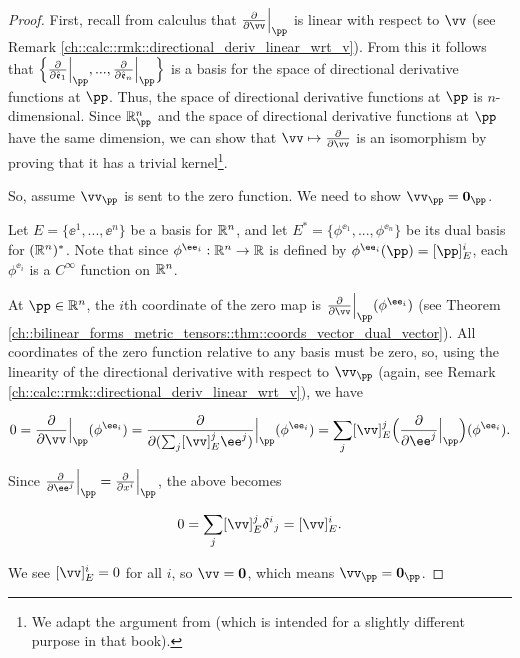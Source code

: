 \begin{proof}
    First, recall from calculus that $\frac{\pd}{\pd \vv}\Big|_\pp$ is linear with respect to $\vv$ (see Remark \ref{ch::calc::rmk::directional_deriv_linear_wrt_v}). From this it follows that $\Big\{ \frac{\pd}{\pd \see_1}\Big|_\pp, ..., \frac{\pd}{\pd \see_n}\Big|_\pp \Big\}$ is a basis for the space of directional derivative functions at $\pp$. Thus, the space of directional derivative functions at $\pp$ is $n$-dimensional. Since $\R^n_\pp$ and the space of directional derivative functions at $\pp$ have the same dimension, we can show that $\vv \mapsto \frac{\pd}{\pd \vv}$ is an isomorphism by proving that it has a trivial kernel\footnote{We adapt the argument from \cite[p. 53]{book::SM} (which is intended for a slightly different purpose in that book).}.
    
    So, assume $\vv_\pp$ is sent to the zero function. We need to show $\vv_\pp = \mathbf{0}_\pp$. 
    
    Let $E = \{\ee^1, ..., \ee^n\}$ be a basis for $\mathbb{R}^n$, and let $E^* = \{\phi^{\ee_1}, ..., \phi^{\ee_n}\}$ be its dual basis for $(\mathbb{R}^n)^*$. Note that since $\phi^{\ee_i}:\R^n \rightarrow \R$ is defined by $\phi^{\ee_i}(\pp) = [\pp]_E^i$, each $\phi^{\ee_i}$ is a $C^\infty$ function on $\mathbb{R}^n$.
    
    At $\pp \in \R^n$, the $i$th coordinate of the zero map is $\frac{\pd}{\pd \vv}\Big|_\pp (\phi^{\ee_i})$ (see Theorem \ref{ch::bilinear_forms_metric_tensors::thm::coords_vector_dual_vector}). All coordinates of the zero function relative to any basis must be zero, so, using the linearity of the directional derivative with respect to $\vv_\pp$ (again, see Remark \ref{ch::calc::rmk::directional_deriv_linear_wrt_v}), we have
    
    \begin{align*}
        0 
        = \frac{\pd}{\pd \vv}\Big|_\pp (\phi^{\ee_i}) 
        = \frac{\pd}{\pd (\sum_j [\vv]_E^j \ee^j)}\Big|_\pp (\phi^{\ee_i}) 
        = \sum_j [\vv]_E^j \Big( \frac{\pd}{\pd \ee^j}\Big|_\pp \Big) (\phi^{\ee_i}).
    \end{align*}
    
    Since $\frac{\pd}{\pd \ee^j}\Big|_\pp = \frac{\pd}{\pd x^i}\Big|_\pp$, the above becomes
    
    \begin{align*}
        0 = \sum_j [\vv]_E^j \delta^i{}_j = [\vv]_E^i.
    \end{align*}
    
    We see $[\vv]_E^i = 0$ for all $i$, so $\vv = \mathbf{0}$, which means $\vv_\pp = \mathbf{0}_\pp$.
\end{proof}

